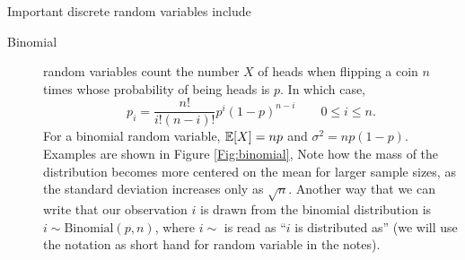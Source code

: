 Important discrete random variables include
\begin{description}
\item[Binomial]  random variables count the number $X$ of heads when
  flipping a coin $n$ times whose probability of being heads is $p$. In which case, 
\begin{equation}
  p_i = \frac{n!}{i!(n-i)!} p^i (1-p)^{n-i} \qquad 0\le i \le n. \label{eqn:binomial_dist}
\end{equation}
For a binomial random variable, $\mathbb{E}[X]=np$ and
$\sigma^2=np(1-p)$. Examples are shown in Figure \ref{Fig:binomial}, Note how the mass of the
   distribution becomes more centered on the mean for larger sample
   sizes, as the standard deviation increases only as $\sqrt{n}$. 
Another way that we can write that our observation $i$ is drawn from
the binomial distribution is $i \sim
\textrm{Binomial}(p,n)$, where $i \sim$ is read as ``$i$ is
distributed as'' (we will use the notation as short hand for random
variable in the notes).


\end{description}
